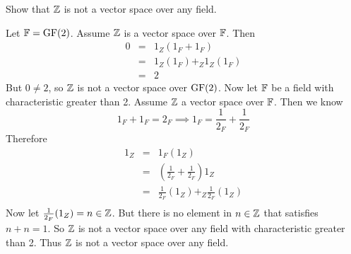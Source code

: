 \begin{ProbBox}  
\newcommand{\F}{\fld{F}}
\begin{problem}[Golan 70]
Show that $\mathbb{Z}$ is not a vector space over any field.
\end{problem}
\smallskip
\begin{solution}
Let $\mathbb{F} = \operatorname{GF}(2)$. Assume $\mathbb{Z}$ is a vector space over $\F$. Then
\begin{eqnarray*}
0 & = & 1_Z(1_F + 1_F) \\
  & = & 1_Z(1_{F})+_Z 1_Z(1_F) \\
  & = & 2 
\end{eqnarray*}
But $0 \neq 2$, so $\mathbb{Z}$ is not a vector space over $\operatorname{GF}(2)$. Now let $\F$ be a field with characteristic greater than 2. Assume $\mathbb{Z}$ a vector space over $\F$. Then we know
$$ 1_F + 1_F = 2_F \implies 1_F = \frac{1}{2_F} + \frac{1}{2_F}$$
Therefore
\begin{eqnarray*}
1_Z & = & 1_F(1_Z) \\
	& = & (\frac{1}{2_F} + \frac{1}{2_F})1_Z \\
	& = & \frac{1}{2_F}(1_Z) +_Z \frac{1}{2_F}(1_Z) \\
\end{eqnarray*}
Now let $\frac{1}{2_F}(1_Z) = n \in \mathbb{Z}$.  But there is no element in $n \in \mathbb{Z}$ that satisfies $n + n = 1$. So $\mathbb{Z}$ is not a vector space over any field with characteristic greater than 2. Thus $\mathbb{Z}$ is not a vector space over any field. 
\end{solution}
\end{ProbBox}

\probskip


